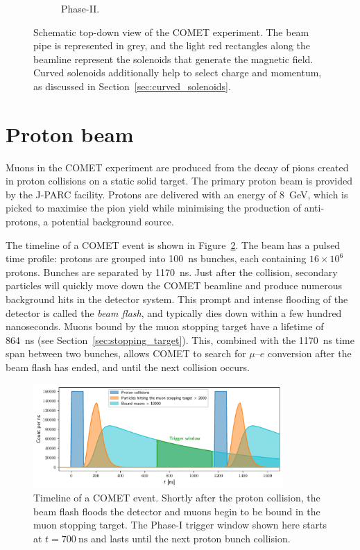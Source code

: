 \begin{figure}
\begin{subfigure}[b]{0.49\textwidth}
        \caption{Phase-II.}
    \end{subfigure}
    \caption{ Schematic top-down view of the COMET experiment. The beam pipe is
    represented in grey, and the light red rectangles along the beamline
    represent the solenoids that generate the magnetic field. Curved solenoids
    additionally help to select charge and momentum, as discussed in
    Section~\ref{sec:curved_solenoids}.}
    \label{fig:comet_schematic}
\end{figure}



\section{Proton beam}\label{sec:COMET_beam}

Muons in the COMET experiment are produced from the decay of pions created in
proton collisions on a static solid target. The primary proton beam is provided
by the J-PARC facility. Protons are delivered with an energy of \SI{8}{\GeV},
which is picked to maximise the pion yield while minimising the production of
anti-protons, a potential background source.

The timeline of a COMET event is shown in Figure~\ref{fig:timing_distributions}.
The beam has a pulsed time profile: protons are grouped into \SI{100}{\ns}
bunches, each containing $16\times 10^6$ protons. Bunches are separated by
\SI{1170}{\ns}. Just after the collision, secondary particles will quickly move
down the COMET beamline and produce numerous background hits in the detector
system. This prompt and intense flooding of the detector is called the
\emph{beam flash}, and typically dies down within a few hundred nanoseconds.
Muons bound by the muon stopping target have a lifetime of \SI{864}{\ns} (see
Section~\ref{sec:stopping_target}). This, combined with the \SI{1170}{\ns} time
span between two bunches, allows COMET to search for $\mu$--$e$ conversion after
the beam flash has ended, and until the next collision occurs. 

\begin{figure}
    \centering
    \includegraphics[width=0.85\textwidth]{chapter2/timing_plot_realistic_beam_flash.pdf}
    \caption{ Timeline of a COMET event. Shortly after the proton collision, the
        beam flash floods the detector and muons begin to be bound in the muon
        stopping target. The Phase-I trigger window shown here starts at
        $t=\SI{700}{\ns}$ and lasts until the next proton bunch collision.  }
    \label{fig:timing_distributions}
\end{figure}

